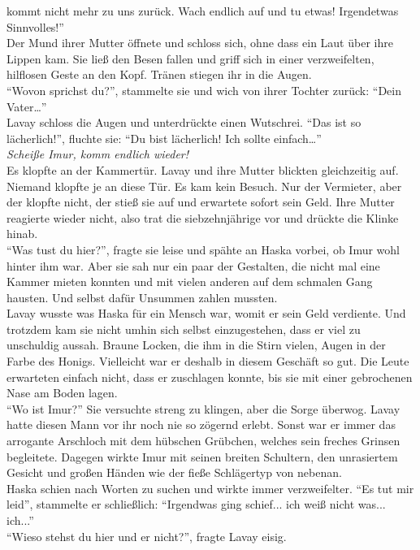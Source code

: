 kommt nicht mehr zu uns zurück. Wach endlich auf und tu etwas! Irgendetwas Sinnvolles!''\\
Der Mund ihrer Mutter öffnete und schloss sich, ohne dass ein Laut über ihre Lippen kam. Sie ließ 
den Besen fallen und griff sich in einer verzweifelten, hilflosen Geste an den Kopf. Tränen stiegen 
ihr in die Augen. \\
``Wovon sprichst du?'', stammelte sie und wich von ihrer Tochter zurück: ``Dein Vater…''\\
Lavay schloss die Augen und unterdrückte einen Wutschrei. ``Das ist so lächerlich!'', fluchte sie: 
``Du bist lächerlich! Ich sollte einfach…''\\
\textit{Scheiße Imur, komm endlich wieder!}\\
Es klopfte an der Kammertür. Lavay und ihre Mutter blickten gleichzeitig auf. Niemand klopfte je an 
diese Tür. Es kam kein Besuch. Nur der Vermieter, aber der klopfte nicht, der stieß sie auf und 
erwartete sofort sein Geld. Ihre Mutter reagierte wieder nicht, also trat die siebzehnjährige vor 
und drückte die Klinke hinab. \\
``Was tust du hier?'', fragte sie leise und spähte an Haska vorbei, ob Imur wohl hinter ihm war. 
Aber sie sah nur ein paar der Gestalten, die nicht mal eine Kammer mieten konnten und mit vielen 
anderen auf dem schmalen Gang hausten. Und selbst dafür Unsummen zahlen mussten. \\
Lavay wusste was Haska für ein Mensch war, womit er sein Geld verdiente. Und trotzdem kam sie nicht 
umhin sich selbst einzugestehen, dass er viel zu unschuldig aussah. Braune Locken, die ihm in die 
Stirn vielen, Augen in der Farbe des Honigs. Vielleicht war er deshalb in diesem Geschäft so gut. 
Die Leute erwarteten einfach nicht, dass er zuschlagen konnte, bis sie mit einer gebrochenen Nase 
am Boden lagen. \\
``Wo ist Imur?'' Sie versuchte streng zu klingen, aber die Sorge überwog. Lavay hatte diesen Mann 
vor ihr noch nie so zögernd erlebt. Sonst war er immer das arrogante Arschloch mit dem hübschen 
Grübchen, welches sein freches Grinsen begleitete. Dagegen wirkte Imur mit seinen breiten 
Schultern, den unrasiertem Gesicht und großen Händen wie der fieße Schlägertyp von nebenan. \\
Haska schien nach Worten zu suchen und wirkte immer verzweifelter. ``Es tut mir leid'', stammelte 
er schließlich: ``Irgendwas ging schief... ich weiß nicht was... ich...''\\
``Wieso stehst du hier und er nicht?'', fragte Lavay eisig.\\
